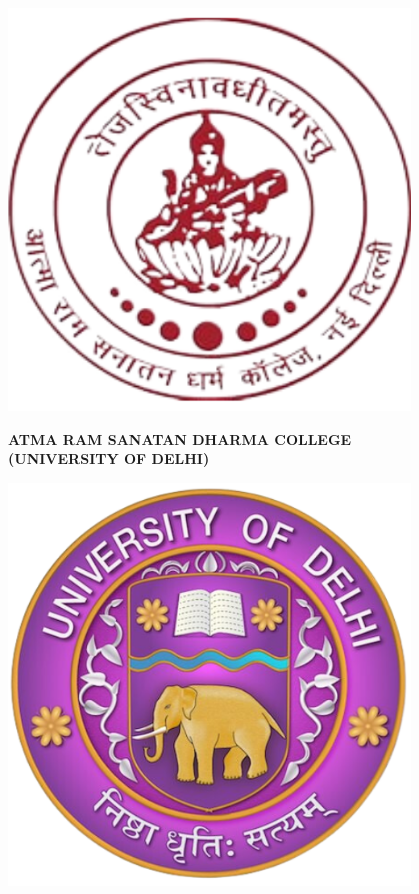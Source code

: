 \begin{titlepage}
    \centering
    \vspace*{0.1in}
    \begin{minipage}{0.19\textwidth}
        \centering
        \includegraphics[width=0.8\textwidth]{Images/arsd_logo.png} %
    \end{minipage}%
    \hfill
    \begin{minipage}{0.6\textwidth}
        \centering
        {\large \textbf{ATMA RAM SANATAN DHARMA COLLEGE}} \\
        \vspace{0.5cm}
        {\large \textbf{(UNIVERSITY OF DELHI)}} 
    \end{minipage}%
    \hfill
    \begin{minipage}{0.19\textwidth}
        \centering
        \includegraphics[width=0.8\textwidth]{Images/du_logo.png} %
    \end{minipage}


\end{titlepage}
